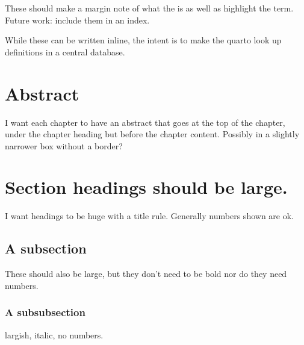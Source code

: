 \documentclass[
  letterpaper, 12pt
]{report}
\begin{document}
These should make a margin note of what the  is as well as highlight the term. Future work: include them in an index.

While these can be written inline, the intent is to make the quarto look up definitions in a central database.

\section{Abstract}

I want each chapter to have an abstract that goes at the top of the chapter, under the chapter heading but before the chapter content. Possibly in a slightly narrower box without a border?

\section{Section headings should be large.}
I want headings to be huge with a title rule.  Generally numbers shown are ok.

\subsection{A subsection}

These should also be large, but they don't need to be bold nor do they need numbers.

\subsubsection{A subsubsection}

largish, italic, no numbers.  
\end{document}
